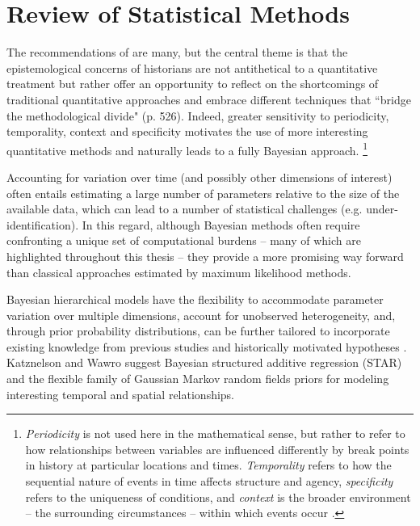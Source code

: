
\chapter{Review of Statistical Methods}
\label{lit_review}



The recommendations of  are many, but the central 
theme is that the epistemological concerns of historians are not antithetical to a 
quantitative treatment but rather offer an opportunity to reflect on the shortcomings 
of traditional quantitative approaches and embrace different techniques that ``bridge 
the methodological divide" (p. 526). Indeed, greater sensitivity to periodicity, temporality, 
context and specificity motivates the use of more interesting quantitative methods and 
naturally leads to a fully Bayesian approach.%
\footnote{ 
{\it Periodicity} is not used here in the mathematical sense, but rather to refer to how relationships 
between variables are influenced differently by break points in history at particular locations and times. 
{\it Temporality} refers to how the sequential nature of events in time affects structure and agency, 
{\it specificity} refers to the uniqueness of conditions, and
{\it context} is the broader environment -- the surrounding circumstances -- within which events occur
.
} %

Accounting for variation over time (and possibly other dimensions of interest) often entails 
estimating a large number of parameters relative to the size of the available data, which can lead 
to a number of statistical challenges (e.g. under-identification). In this regard, although Bayesian 
methods often require confronting a unique set of computational burdens -- many of which are 
highlighted throughout this thesis -- they provide a more promising way forward than 
classical approaches estimated by maximum likelihood methods. 

Bayesian hierarchical models have the flexibility to accommodate parameter 
variation over multiple dimensions, account for unobserved heterogeneity, and, 
through prior probability distributions, can be further tailored to incorporate existing 
knowledge from previous studies and historically motivated hypotheses 
\cite{wawro_designing_2014, goodrich_designing_2012}. 
Katznelson and Wawro suggest Bayesian structured additive regression (STAR) 
and the flexible family of Gaussian Markov 
random fields priors for modeling interesting temporal and spatial relationships. 

